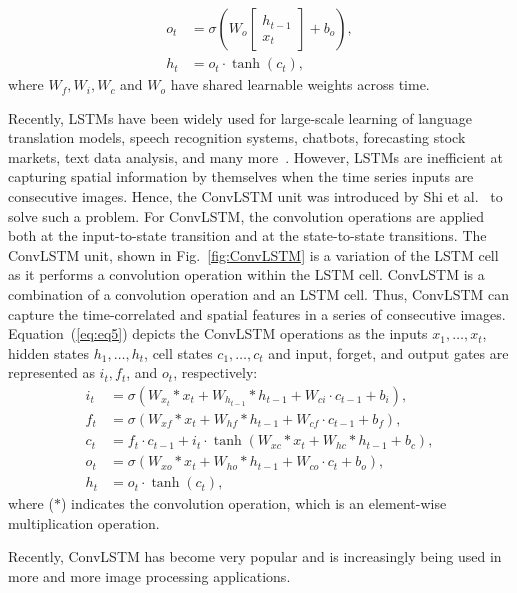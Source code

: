 \begin{sloppypar}
	\begin{equation}
		\begin{aligned}
			o_{t} &=\sigma\left(W_{o} 
			\left[
			\begin{array}{c}
				h_{t-1} \\ x_{t}
			\end{array} 
			\right]
			+b_{o}\right), \\
			h_{t} &=o_{t} \cdot \tanh \left(c_{t}\right),
		\end{aligned}
		\label{eq:eq4}
	\end{equation} 
	where \(W_{f}, W_{i}, W_{c}\) and \(W_{o}\) have shared learnable weights across time.
	
	Recently, LSTMs have been widely used for large-scale learning of language translation models, speech recognition systems, chatbots, forecasting stock markets, text data analysis, and many more~\cite{graves2014towards, cho2014properties}. 
	However, LSTMs are inefficient at capturing spatial information by themselves when the time series inputs are consecutive images.
	Hence, the ConvLSTM unit was introduced by Shi et al.~\cite{xingjian2015convolutional} to solve such a problem.
	For ConvLSTM, the convolution operations are applied both at the input-to-state transition and at the state-to-state transitions.  
	The ConvLSTM unit, shown in Fig.~\ref{fig:ConvLSTM} is a variation of the LSTM cell as it performs a convolution operation within the LSTM cell.
	ConvLSTM is a combination of a convolution operation and an LSTM cell.
	Thus, ConvLSTM can capture the time-correlated and spatial features in a series of consecutive images.
	Equation~(\ref{eq:eq5}) depicts the ConvLSTM operations as the inputs \(x_1, \dots, x_t\), hidden states \(h_1, \dots, h_t\), cell states \(c_1, \dots, c_t\) and input, forget, and output gates are represented as \(i_t, f_t\), and \(o_t\), respectively:
	\begin{equation}
		\begin{aligned}
			i_{t} &=\sigma\left(W_{x_t} * x_{t}+W_{h_{t-1}} * h_{t-1}+W_{c i} \cdot c_{t-1}+b_{i}\right),
			\\
			f_{t} &=\sigma\left(W_{x f} * x_{t}+W_{h f} * h_{t-1}+W_{c f} \cdot c_{t-1}+b_{f}\right), \\
			c_{t} &=f_{t} \cdot c_{t-1}+i_{t} \cdot \tanh \left(W_{x c} * x_{t}+W_{h c} * h_{t-1}+b_{c}\right), 
			\\
			o_{t} &=\sigma\left(W_{x o} * x_{t}+W_{h o} * h_{t-1}+W_{c o} \cdot c_{t}+b_{o}\right), \\
			h_{t} &=o_{t} \cdot \tanh \left(c_{t}\right),
		\end{aligned}
		\label{eq:eq5}
	\end{equation}
	where (\(*\)) indicates the convolution operation, which is an element-wise multiplication operation.
	
	Recently, ConvLSTM has become very popular and is increasingly being used in 
	more and more image processing applications.
\end{sloppypar}
